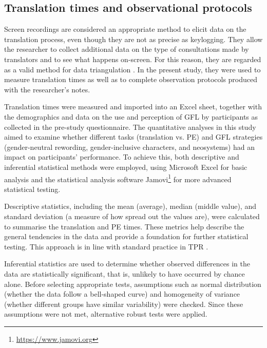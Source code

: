 \subsection{Translation times and observational protocols}

Screen recordings are considered an appropriate method to elicit data on the translation process, even though they are not as precise as keylogging. They allow the researcher to collect additional data on the type of consultations made by translators and to see what happens on-screen. For this reason, they are regarded as a valid method for data triangulation \citep{angelone2013impact}. In the present study, they were used to measure translation times as well as to complete observation protocols produced with the researcher's notes.

Translation times were measured and imported into an Excel sheet, together with the demographics and data on the use and perception of GFL by participants as collected in the pre-study questionnaire. The quantitative analyses in this study aimed to examine whether different tasks (translation vs. PE) and GFL strategies (gender-neutral rewording, gender-inclusive characters, and neosystems) had an impact on participants' performance. To achieve this, both descriptive and inferential statistical methods were employed, using Microsoft Excel for basic analysis and the statistical analysis software Jamovi\footnote{\url{https://www.jamovi.org}} for more advanced statistical testing.

Descriptive statistics, including the mean (average), median (middle value), and standard deviation (a measure of how spread out the values are), were calculated to summarise the translation and PE times. These metrics help describe the general tendencies in the data and provide a foundation for further statistical testing. This approach is in line with standard practice in TPR \citep{o2009eye}.

Inferential statistics are used to determine whether observed differences in the data are statistically significant, that is, unlikely to have occurred by chance alone. Before selecting appropriate tests, assumptions such as normal distribution (whether the data follow a bell-shaped curve) and homogeneity of variance (whether different groups have similar variability) were checked. Since these assumptions were not met, alternative robust tests were applied.

